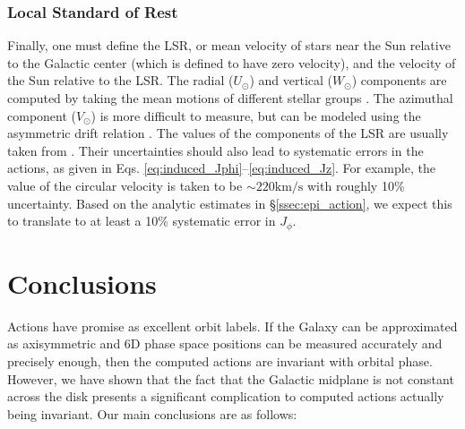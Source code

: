 \documentclass[twocolumn]{aastex62}
\newcommand{\kms}{\text{km}/\text{s}}
\begin{document}
\subsubsection{Local Standard of Rest}
Finally, one must define the LSR, or mean velocity of stars near the Sun
relative to the Galactic center (which is defined to have zero velocity), and
the velocity of the Sun relative to the LSR. The radial ($U_{\odot}$) and
vertical ($W_{\odot}$) components are computed by taking the mean motions of
different stellar groups \citep[e.g.][]{2012MNRAS.427..274S}. The azimuthal
component ($V_{\odot}$) is more difficult to measure, but can be modeled using
the asymmetric drift relation \citep{2008gady.book.....B}. The values of the
components of the LSR are usually taken from \citet{2010MNRAS.403.1829S}. Their uncertainties should also lead to systematic errors in the actions, as given in Eqs. \ref{eq:induced_Jphi}--\ref{eq:induced_Jz}. For example, the
value of the circular velocity is taken to be $\sim 220\kms$
\citep[e.g.][]{2012ApJ...759..131B} with roughly 10\% uncertainty. Based on the analytic estimates in \S \ref{ssec:epi_action}, we expect this to translate to at least a 10\% systematic error in $J_{\phi}$.

\section{Conclusions}\label{sec:conclusion}
Actions have promise as excellent orbit labels. If the Galaxy can be
approximated as axisymmetric and 6D phase space positions can be measured
accurately and precisely enough, then the computed actions are invariant with
orbital phase. However, we have shown that the fact that the Galactic midplane
is not constant across the disk presents a significant complication to
computed actions actually being invariant. Our main conclusions are as
follows:
\end{document}
